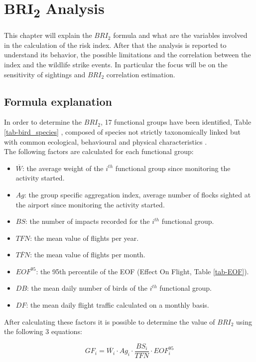 
\chapter{BRI\textsubscript{2} Analysis}\label{ch:Ch.3}

This chapter will explain the $BRI_2$ formula and what are the variables involved in the calculation of the risk index. After that the analysis is reported to understand its behavior, the possible limitations and the correlation between the index and the wildlife strike events.
In particular the focus will be on the sensitivity of sightings and $BRI_2$ correlation estimation.

\section{Formula explanation}\label{Formula_explanation}
In order to determine the $BRI_2$, 17 functional groups have been identified, Table \ref{tab-bird_species} , composed of species not strictly taxonomically linked but with common ecological, behavioural and physical characteristics \cite{ENACcircolareAPT_01B}.
\\
The following factors are calculated for each functional group:

\begin{itemize}
    \item $\overline{W}$: the average weight of the $i^{th}$ functional group since monitoring the activity started.
    \item $Ag$: the group specific aggregation index, average number of flocks sighted at the airport since monitoring the activity started.
    \item $BS$: the number of impacts recorded for the $i^{th}$ functional group.
    \item $TFN$: the mean value of flights per year.
    \item $\overline{TFN}$: the mean value of flights per month.
    \item $EOF^{95}$: the 95th percentile of the EOF (Effect On Flight, Table \ref{tab-EOF}).
    \item $DB$: the mean daily number of birds of the $i^{th}$ functional group.
    \item $DF$: the mean daily flight traffic calculated on a monthly basis.
\end{itemize}
After calculating these factors it is possible to determine the value of $BRI_2$ using the following 3 equations:

\begin{equation} \label{eq:3.1}
GF_i=\overline{W_i}\cdot Ag_i \cdot\frac{BS_i}{TFN} \cdot EOF_i ^{95} 
\end{equation}

